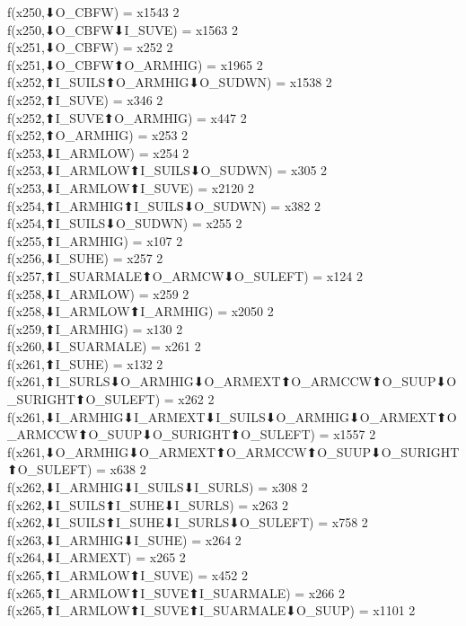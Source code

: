 f(x250,⬇O_CBFW) = x1543 {2} \\
f(x250,⬇O_CBFW⬇I_SUVE) = x1563 {2} \\
f(x251,⬇O_CBFW) = x252 {2} \\
f(x251,⬇O_CBFW⬆O_ARMHIG) = x1965 {2} \\
f(x252,⬆I_SUILS⬆O_ARMHIG⬇O_SUDWN) = x1538 {2} \\
f(x252,⬆I_SUVE) = x346 {2} \\
f(x252,⬆I_SUVE⬆O_ARMHIG) = x447 {2} \\
f(x252,⬆O_ARMHIG) = x253 {2} \\
f(x253,⬇I_ARMLOW) = x254 {2} \\
f(x253,⬇I_ARMLOW⬆I_SUILS⬇O_SUDWN) = x305 {2} \\
f(x253,⬇I_ARMLOW⬆I_SUVE) = x2120 {2} \\
f(x254,⬆I_ARMHIG⬆I_SUILS⬇O_SUDWN) = x382 {2} \\
f(x254,⬆I_SUILS⬇O_SUDWN) = x255 {2} \\
f(x255,⬆I_ARMHIG) = x107 {2} \\
f(x256,⬇I_SUHE) = x257 {2} \\
f(x257,⬆I_SUARMALE⬆O_ARMCW⬇O_SULEFT) = x124 {2} \\
f(x258,⬇I_ARMLOW) = x259 {2} \\
f(x258,⬇I_ARMLOW⬆I_ARMHIG) = x2050 {2} \\
f(x259,⬆I_ARMHIG) = x130 {2} \\
f(x260,⬇I_SUARMALE) = x261 {2} \\
f(x261,⬆I_SUHE) = x132 {2} \\
f(x261,⬆I_SURLS⬇O_ARMHIG⬇O_ARMEXT⬆O_ARMCCW⬆O_SUUP⬇O_SURIGHT⬆O_SULEFT) = x262 {2} \\
f(x261,⬇I_ARMHIG⬇I_ARMEXT⬇I_SUILS⬇O_ARMHIG⬇O_ARMEXT⬆O_ARMCCW⬆O_SUUP⬇O_SURIGHT⬆O_SULEFT) = x1557 {2} \\
f(x261,⬇O_ARMHIG⬇O_ARMEXT⬆O_ARMCCW⬆O_SUUP⬇O_SURIGHT⬆O_SULEFT) = x638 {2} \\
f(x262,⬇I_ARMHIG⬇I_SUILS⬇I_SURLS) = x308 {2} \\
f(x262,⬇I_SUILS⬆I_SUHE⬇I_SURLS) = x263 {2} \\
f(x262,⬇I_SUILS⬆I_SUHE⬇I_SURLS⬇O_SULEFT) = x758 {2} \\
f(x263,⬇I_ARMHIG⬇I_SUHE) = x264 {2} \\
f(x264,⬇I_ARMEXT) = x265 {2} \\
f(x265,⬆I_ARMLOW⬆I_SUVE) = x452 {2} \\
f(x265,⬆I_ARMLOW⬆I_SUVE⬆I_SUARMALE) = x266 {2} \\
f(x265,⬆I_ARMLOW⬆I_SUVE⬆I_SUARMALE⬇O_SUUP) = x1101 {2} \\

